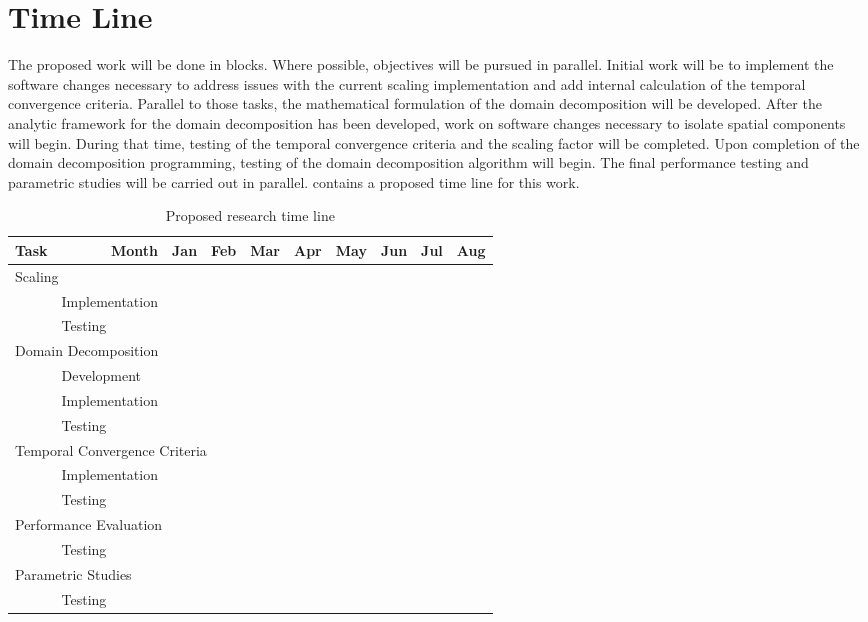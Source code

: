 \section{Time Line}
\label{sect:proposal_time_line}
The proposed work will be done in blocks.
Where possible, objectives will be pursued in parallel.
Initial work will be to implement the software changes necessary to address issues with the current scaling implementation and add internal calculation of the temporal convergence criteria.
Parallel to those tasks, the mathematical formulation of the domain decomposition will be developed.
After the analytic framework for the domain decomposition has been developed, work on software changes necessary to isolate spatial components will begin.
During that time, testing of the temporal convergence criteria and the scaling factor will be completed.
Upon completion of the domain decomposition programming, testing of the domain decomposition algorithm will begin.
The final performance testing and parametric studies will be carried out in parallel.
 contains a proposed time line for this work.

\newcommand{\cc}{\cellcolor{black}}
\begin{table}[h]
\singlespace
\centering
\begin{tabular}{@{}l l c c c c  c c c c @{}} \toprule
Task & \multicolumn{1}{r}{Month} & Jan & Feb & Mar & Apr & May & Jun & Jul & Aug\\
\midrule
\multicolumn{10}{l}{Scaling}  \\
& Implementation & \cc & \cc &     &     &     &     &     &     \\
& Testing        &     & \cc & \cc &     &     &     &     &     \\
\multicolumn{10}{l}{Domain Decomposition} \\
& Development    & \cc & \cc &     &     &     &     &     &     \\
& Implementation &     & \cc & \cc & \cc &     &     &     &     \\
& Testing        &     &     &     & \cc & \cc &     &     &     \\
\multicolumn{10}{l}{Temporal Convergence Criteria}\\
& Implementation & \cc & \cc &     &     &     &     &     &     \\
& Testing        &     &     & \cc & \cc &     &     &     &     \\
\multicolumn{10}{l}{Performance Evaluation} \\
& Testing        &     &     &     &     & \cc & \cc & \cc &     \\
\multicolumn{10}{l}{Parametric Studies} \\
& Testing        &     &     &     &     &     & \cc & \cc &     \\
\bottomrule  
\end{tabular}
\caption{Proposed research time line}
\label{tab:time_line}
\end{table}
